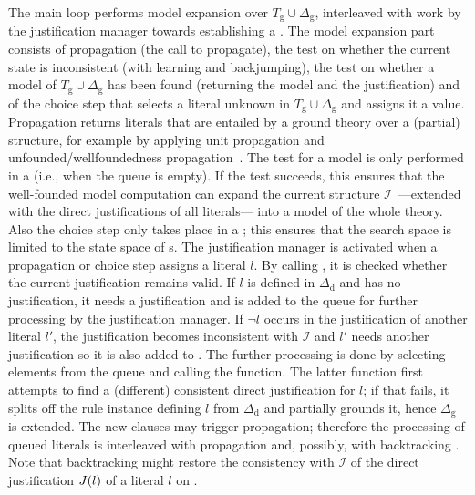 \documentclass[11pt]{article}
\newcommand{\m}[1]{\ensuremath{#1}\xspace}
\newcommand{\I}{\m{\mathcal{I}}}
\newcommand{\D}{\m{\Delta}}
\theoremstyle{plain}
\theoremstyle{definition}
\theoremstyle{example_basic}
\theoremstyle{example_contd}
\theoremstyle{plain}
\newcommand{\Dg}{\ensuremath{\D_\text{g}}\xspace}
\newcommand{\Dd}{\ensuremath{\D_\text{d}}\xspace}
\newcommand{\Sg}{\ensuremath{T_\text{g}}\xspace}
\newcommand{\change}[1]{#1}
\begin{document}
The main loop performs model expansion over $\Sg\cup\Dg$, interleaved
with work by the justification manager towards establishing a
\dstate. The model expansion part consists of propagation (the call to
\textsf{propagate}), the test on whether the current state is
inconsistent (with learning and backjumping), the test on whether a
model of $\Sg\cup\Dg$ has been found (returning the model and the
justification) and of the choice step that selects a literal unknown
in $\Sg\cup\Dg$ and assigns it a value. \change{Propagation returns
  literals that are entailed by a ground theory over a (partial)
  structure, for example by applying unit propagation and
  unfounded/wellfoundedness propagation~\shortcite{sat/MarienWDB08}.}
The test for a model is only performed in a \dstate (i.e., when the
queue \changes is empty). If the test succeeds,  this ensures that the
well-founded model computation can expand the current structure
\I~---extended with the direct justifications of all literals--- into
a model of the whole theory. Also the choice step only takes place in
a \dstate; this ensures that the search space is limited to the state
space of {\dstate}s. 
\change{The justification manager is activated when a propagation or
  choice step assigns a literal $l$. By calling \checkliteral, it is
  checked whether the current justification remains valid. If $l$ is
  defined in \Dd and has no justification, it needs a justification
  and is added to the queue \changes for further processing by the
  justification manager. If $\neg l$ occurs in the justification of
  another literal $l'$, the justification becomes inconsistent with \I
  and $l'$ needs another justification so it is also added to
  \changes. The further processing is done by selecting elements from
  the queue and calling the \lazyground function. The latter function
  first attempts to find a (different) consistent direct justification
  for $l$; if that fails, it splits off the rule instance defining $l$
  from \Dd and partially grounds it, hence \Dg is extended. The new
  clauses may trigger propagation; therefore the
  processing of queued literals is interleaved with propagation
  and, possibly, with backtracking . Note
  that backtracking might restore the consistency with \I of the
  direct justification $J(l)$ of a literal $l$ on \changes.  }
\end{document}
